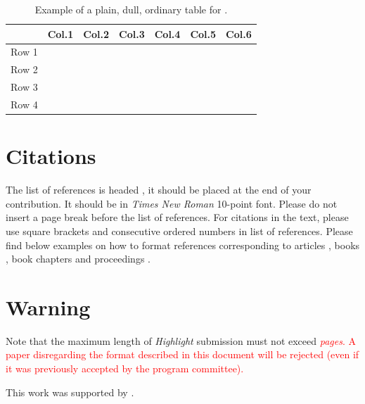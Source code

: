 \documentclass[highlight, final]{jobim2017}
\begin{document}
\begin{table}[ht]
  \begin{center}
    \begin{tabular}{|l|c|c|c|c|c|c|}
      \hline
              & Col.1 & Col.2 & Col.3 & Col.4 & Col.5 & Col.6 \\
       \hline
       Row 1 &        &       &       &       &       &      \\
       \hline
       Row 2 &        &       &       &       &       &      \\
       \hline
       Row 3 &        &       &       &       &       &      \\
       \hline
       Row 4 &        &       &       &       &       &      \\
       \hline
    \end{tabular}
  \end{center}
  \caption{Example of a plain, dull, ordinary table for \jobim.}
  \label{tab:exple}
\end{table}

\section{Citations}
\label{sec:citations}

The list of references is headed
\emph{\refname}, it should be placed at the end of your
contribution. It should be in \emph{Times New Roman} 10-point font. Please do not
insert a page break before the list of references. For citations in the text,
please use square brackets \cite{Sokal1996} and consecutive ordered numbers
\cite{GastelDay2016,Cormode2012} in list of references.
Please find below examples on how to format references corresponding to
articles \cite{Sokal1996}, books \cite{GastelDay2016}, book chapters and proceedings
\cite{Cormode2012}.

\section{Warning} 
Note that the maximum length of \emph{Highlight} submission must not exceed \textcolor{red}{\emph{\JobimHighlightMaxPages{} pages}. A paper disregarding the
format described in this document will be rejected (even if it was previously accepted 
by the program committee).}

\begin{acknowledgements}
  \label{sec:acknowledgements}
  
 This work was supported by .
\end{acknowledgements}


 
 
\end{document}
